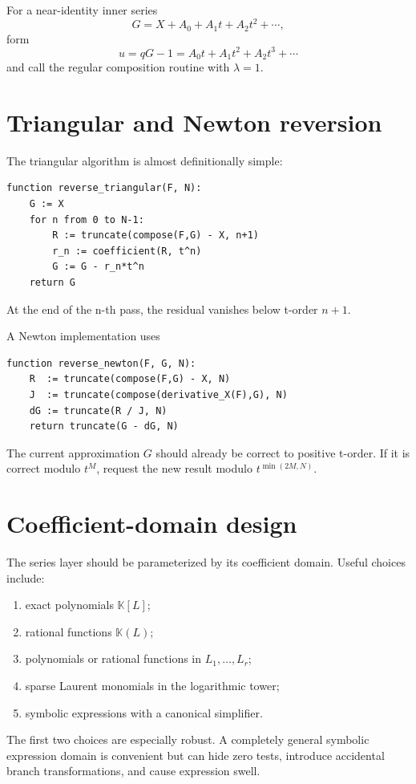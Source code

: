 \documentclass[11pt,openany]{book}
\theoremstyle{definition}
\theoremstyle{plain}
\theoremstyle{remark}
\newcommand{\K}{\mathbb{K}}
\begin{document}
For a near-identity inner series
\[
 G=X+A_0+A_1t+A_2t^2+\cdots,
\]
form
\begin{equation}\label{eq:implementation-u}
 u=qG-1=A_0t+A_1t^2+A_2t^3+\cdots
\end{equation}
and call the regular composition routine with \(\lambda=1\).

\section{Triangular and Newton reversion}
The triangular algorithm is almost definitionally simple:
\begin{lstlisting}[style=pseudostyle]
function reverse_triangular(F, N):
    G := X
    for n from 0 to N-1:
        R := truncate(compose(F,G) - X, n+1)
        r_n := coefficient(R, t^n)
        G := G - r_n*t^n
    return G
\end{lstlisting}
At the end of the n-th pass, the residual vanishes below t-order \(n+1\).

A Newton implementation uses
\begin{lstlisting}[style=pseudostyle]
function reverse_newton(F, G, N):
    R  := truncate(compose(F,G) - X, N)
    J  := truncate(compose(derivative_X(F),G), N)
    dG := truncate(R / J, N)
    return truncate(G - dG, N)
\end{lstlisting}
The current approximation \(G\) should already be correct to positive t-order.
If it is correct modulo \(t^M\), request the new result modulo
\(t^{\min(2M,N)}\).

\section{Coefficient-domain design}
The series layer should be parameterized by its coefficient domain.  Useful
choices include:
\begin{enumerate}
\item exact polynomials \(\K[L]\);
\item rational functions \(\K(L)\);
\item polynomials or rational functions in \(L_1,\ldots,L_r\);
\item sparse Laurent monomials in the logarithmic tower;
\item symbolic expressions with a canonical simplifier.
\end{enumerate}
The first two choices are especially robust.  A completely general symbolic
expression domain is convenient but can hide zero tests, introduce accidental
branch transformations, and cause expression swell.
\end{document}
